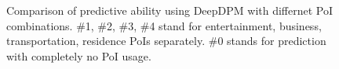 \documentclass[letterpaper]{article} %
\begin{document}

\begin{figure}[h]
    \centering

    \caption{Comparison of predictive ability using DeepDPM with differnet PoI combinations. \#1, \#2, \#3, \#4 stand for entertainment, business, transportation, residence PoIs separately. \#0 stands for prediction with completely no PoI usage.}
    \label{fig:poi_combination}
\end{figure}
\end{document}
